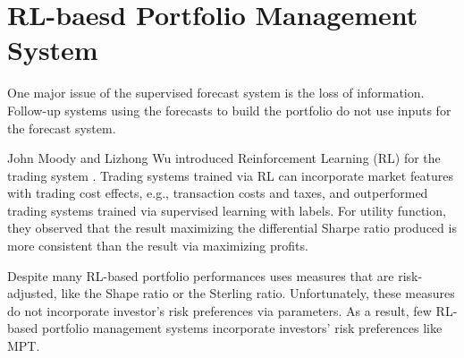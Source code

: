 \section{RL-baesd Portfolio Management System}
One major issue of the supervised forecast system is the loss of information. Follow-up systems using the forecasts to build the portfolio do not use inputs for the forecast system.
\par
John Moody and Lizhong Wu introduced Reinforcement Learning (RL) for the trading system \cite{618952}. Trading systems trained via RL can incorporate market features with trading cost effects, e.g., transaction costs and taxes, and outperformed trading systems trained via supervised learning with labels. For utility function, they observed that the result maximizing the differential Sharpe ratio produced is more consistent than the result via maximizing profits\cite{618952}.
\par
Despite many RL-based portfolio performances uses measures that are risk-adjusted\cite{cogneau2009101}, like the Shape ratio\cite{Sharpe49} or the Sterling ratio\cite{magdon2004maximum}. Unfortunately, these measures do not incorporate investor's risk preferences via parameters. As a result, few RL-based portfolio management systems incorporate investors' risk preferences like MPT. 